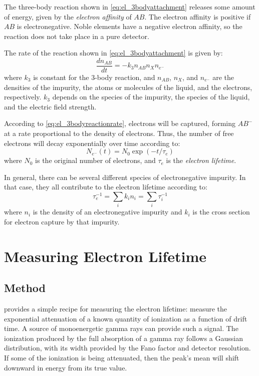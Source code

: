 \documentclass[herrin-thesis.tex]{subfiles}
\begin{document}
The three-body reaction shown in \cref{eq:el_3bodyattachment} releases some amount of energy, given by the \emph{electron affinity} of \(AB\). The electron affinity is positive if \(AB\) is electronegative. Noble elements have a negative electron affinity, so the reaction does not take place in a pure detector.

The rate of the reaction shown in \cref{eq:el_3bodyattachment} is given by:
\begin{equation}
\frac{dn_{AB}}{dt} = -k_{3} n_{AB} n_{X} n_{e^{-}}
\label{eq:el_3bodyreactionrate}
\end{equation}
where \(k_3\) is constant for the 3-body reaction, and \(n_{AB}\), \(n_{X}\), and \(n_{e^{-}}\) are the densities of the impurity, the atoms or molecules of the liquid, and the electrons, respectively. \(k_3\) depends on the species of the impurity, the species of the liquid, and the electric field strength.

According to \cref{eq:el_3bodyreactionrate}, electrons will be captured, forming \(AB^{-}\) at a rate proportional to the density of electrons. Thus, the number of free electrons will decay exponentially over time according to:
\begin{equation}
N_{e^{-}}(t) = N_0 \exp (-t/\tau_e)
\label{eq:el_exponentialtaue}
\end{equation}
where \(N_0\) is the original number of electrons, and \(\tau_e\) is the \emph{electron lifetime}.

In general, there can be several different species of electronegative impurity. In that case, they all contribute to the electron lifetime according to:
\begin{equation}
\tau_e^{-1} = \sum_i k_i n_i = \sum_i\tau_i^{-1}
\label{eq:el_tauedefinition}
\end{equation}
where \(n_i\) is the density of an electronegative impurity and \(k_i\) is the cross section for electron capture by that impurity.

\section{Measuring Electron Lifetime}

\subsection{Method}
 provides a simple recipe for measuring the electron lifetime: measure the exponential attenuation of a known quantity of ionization as a function of drift time. A source of monoenergetic gamma rays can provide such a signal. The ionization produced by the full absorption of a gamma ray follows a Gaussian distribution, with its width provided by the Fano factor and detector resolution. If some of the ionization is being attenuated, then the peak's mean will shift downward in energy from its true value.
\end{document}
